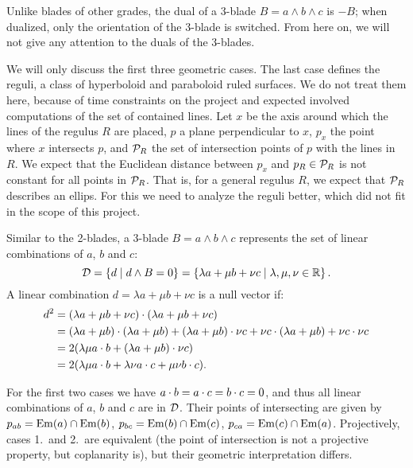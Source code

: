 Unlike blades of other grades, the dual of a 3-blade $B = a \wedge b \wedge c$ is $-B$; when dualized, only the orientation of the 3-blade is switched.  From here on, we will not give any attention to the duals of the 3-blades.

We will only discuss the first three geometric cases.  The last case defines the reguli, a class of hyperboloid and paraboloid ruled surfaces.  We do not treat them here, because of time constraints on the project and expected involved computations of the set of contained lines.  Let $x$ be the axis around which the lines of the regulus $R$ are placed, $p$ a plane perpendicular to $x$, $p_x$ the point where $x$ intersects $p$, and $\mathcal{P}_R$ the set of intersection points of $p$ with the lines in $R$.  We expect that the Euclidean distance between $p_x$ and $p_R \in \mathcal{P}_R$ is not constant for all points in $\mathcal{P}_R$.  That is, for a general regulus $R$, we expect that $\mathcal{P}_R$ describes an ellips.  For this we need to analyze the reguli better, which did not fit in the scope of this project.

Similar to the 2-blades, a 3-blade $B = a \wedge b \wedge c$ represents the set of linear combinations of $a$, $b$ and $c$:
\begin{equation*}
  \mathcal{D} = \left\{d \mid d \wedge B = 0 \right\} = \left\{ \lambda a + \mu b + \nu c \mid \lambda, \mu, \nu \in \mathbb{R} \right\} .
\end{equation*}
A linear combination $d = \lambda a + \mu b + \nu c$ is a null vector if:
\begin{align*}
  d^2 &= (\lambda a + \mu b + \nu c) \mathbin{\cdot} (\lambda a + \mu b + \nu c) \\
  &= (\lambda a + \mu b) \mathbin{\cdot} (\lambda a + \mu b) + (\lambda a + \mu b) \mathbin{\cdot} \nu c + \nu c \mathbin{\cdot} (\lambda a + \mu b) + \nu c \mathbin{\cdot} \nu c \\
  &= 2 (\lambda \mu a \mathbin{\cdot} b + (\lambda a + \mu b) \mathbin{\cdot} \nu c) \\
  &= 2 (\lambda \mu a \mathbin{\cdot} b + \lambda \nu a \mathbin{\cdot} c + \mu \nu b \mathbin{\cdot} c) .
\end{align*}

For the first two cases we have $a \mathbin{\cdot} b = a \mathbin{\cdot} c = b \mathbin{\cdot} c = 0$, and thus all linear combinations of $a$, $b$ and $c$ are in $\mathcal{D}$.  Their points of intersecting are given by $p_{ab} = \operatorname{Em}(a) \cap \operatorname{Em}(b)$, $p_{bc} = \operatorname{Em}(b) \cap \operatorname{Em}(c)$, $p_{ca} = \operatorname{Em}(c) \cap \operatorname{Em}(a)$.  Projectively, cases 1.\ and 2.\ are equivalent (the point of intersection is not a projective property, but coplanarity is), but their geometric interpretation differs.

